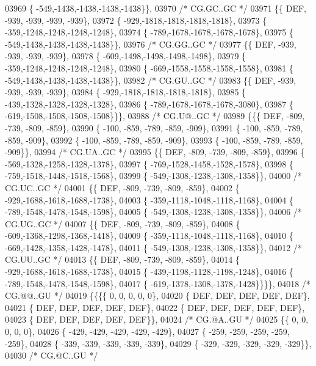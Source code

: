 \begin{DoxyCode}
03969 \{ -549,-1438,-1438,-1438,-1438\}\},
03970 \textcolor{comment}{/* CG.GC..GC */}
03971 \{\{  DEF, -939, -939, -939, -939\},
03972 \{ -929,-1818,-1818,-1818,-1818\},
03973 \{ -359,-1248,-1248,-1248,-1248\},
03974 \{ -789,-1678,-1678,-1678,-1678\},
03975 \{ -549,-1438,-1438,-1438,-1438\}\},
03976 \textcolor{comment}{/* CG.GG..GC */}
03977 \{\{  DEF, -939, -939, -939, -939\},
03978 \{ -609,-1498,-1498,-1498,-1498\},
03979 \{ -359,-1248,-1248,-1248,-1248\},
03980 \{ -669,-1558,-1558,-1558,-1558\},
03981 \{ -549,-1438,-1438,-1438,-1438\}\},
03982 \textcolor{comment}{/* CG.GU..GC */}
03983 \{\{  DEF, -939, -939, -939, -939\},
03984 \{ -929,-1818,-1818,-1818,-1818\},
03985 \{ -439,-1328,-1328,-1328,-1328\},
03986 \{ -789,-1678,-1678,-1678,-3080\},
03987 \{ -619,-1508,-1508,-1508,-1508\}\}\},
03988 \textcolor{comment}{/* CG.U@..GC */}
03989 \{\{\{  DEF, -809, -739, -809, -859\},
03990 \{ -100, -859, -789, -859, -909\},
03991 \{ -100, -859, -789, -859, -909\},
03992 \{ -100, -859, -789, -859, -909\},
03993 \{ -100, -859, -789, -859, -909\}\},
03994 \textcolor{comment}{/* CG.UA..GC */}
03995 \{\{  DEF, -809, -739, -809, -859\},
03996 \{ -569,-1328,-1258,-1328,-1378\},
03997 \{ -769,-1528,-1458,-1528,-1578\},
03998 \{ -759,-1518,-1448,-1518,-1568\},
03999 \{ -549,-1308,-1238,-1308,-1358\}\},
04000 \textcolor{comment}{/* CG.UC..GC */}
04001 \{\{  DEF, -809, -739, -809, -859\},
04002 \{ -929,-1688,-1618,-1688,-1738\},
04003 \{ -359,-1118,-1048,-1118,-1168\},
04004 \{ -789,-1548,-1478,-1548,-1598\},
04005 \{ -549,-1308,-1238,-1308,-1358\}\},
04006 \textcolor{comment}{/* CG.UG..GC */}
04007 \{\{  DEF, -809, -739, -809, -859\},
04008 \{ -609,-1368,-1298,-1368,-1418\},
04009 \{ -359,-1118,-1048,-1118,-1168\},
04010 \{ -669,-1428,-1358,-1428,-1478\},
04011 \{ -549,-1308,-1238,-1308,-1358\}\},
04012 \textcolor{comment}{/* CG.UU..GC */}
04013 \{\{  DEF, -809, -739, -809, -859\},
04014 \{ -929,-1688,-1618,-1688,-1738\},
04015 \{ -439,-1198,-1128,-1198,-1248\},
04016 \{ -789,-1548,-1478,-1548,-1598\},
04017 \{ -619,-1378,-1308,-1378,-1428\}\}\}\},
04018 \textcolor{comment}{/* CG.@@..GU */}
04019 \{\{\{\{    0,    0,    0,    0,    0\},
04020 \{  DEF,  DEF,  DEF,  DEF,  DEF\},
04021 \{  DEF,  DEF,  DEF,  DEF,  DEF\},
04022 \{  DEF,  DEF,  DEF,  DEF,  DEF\},
04023 \{  DEF,  DEF,  DEF,  DEF,  DEF\}\},
04024 \textcolor{comment}{/* CG.@A..GU */}
04025 \{\{    0,    0,    0,    0,    0\},
04026 \{ -429, -429, -429, -429, -429\},
04027 \{ -259, -259, -259, -259, -259\},
04028 \{ -339, -339, -339, -339, -339\},
04029 \{ -329, -329, -329, -329, -329\}\},
04030 \textcolor{comment}{/* CG.@C..GU */}

\end{DoxyCode}

